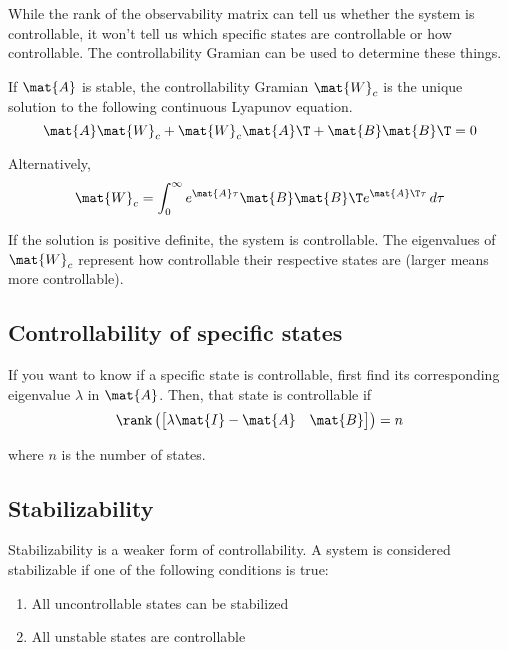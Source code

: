 While the rank of the observability matrix can tell us whether the system is
controllable, it won't tell us which specific states are controllable or how
controllable. The controllability Gramian can be used to determine these things.

If $\mat{A}$ is stable, the controllability Gramian $\mat{W}_c$ is the unique
solution to the following continuous Lyapunov equation.
\begin{equation}
  \mat{A}\mat{W}_c + \mat{W}_c\mat{A}\T + \mat{B}\mat{B}\T = 0
\end{equation}

Alternatively,
\begin{equation}
  \mat{W}_c =
    \int_0^\infty e^{\mat{A}\tau} \mat{B}\mat{B}\T e^{\mat{A}\T\tau} \,d\tau
\end{equation}

If the solution is positive definite, the system is controllable. The
eigenvalues of $\mat{W}_c$ represent how controllable their respective states
are (larger means more controllable).

\subsection{Controllability of specific states}

If you want to know if a specific state is controllable, first find its
corresponding eigenvalue $\lambda$ in $\mat{A}$. Then, that state is
controllable if
\begin{equation}
  \rank\left(
  \begin{bmatrix}
    \lambda\mat{I} - \mat{A} & \mat{B}
  \end{bmatrix}\right) = n
\end{equation}

where $n$ is the number of \glspl{state}.

\subsection{Stabilizability}
\label{subsec:stabilizability}

Stabilizability is a weaker form of controllability. A system is considered
stabilizable if one of the following conditions is true:
\begin{enumerate}
  \item All uncontrollable states can be stabilized
  \item All unstable states are controllable
\end{enumerate}

